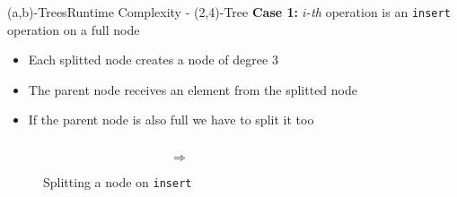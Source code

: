 \begin{frame}{(a,b)-Trees}{Runtime Complexity - (2,4)-Tree}
  \textbf{Case 1:}
  {\color{Mittel-Blau}$i$}-\textit{th} operation is an
  \texttt{\color{Mittel-Blau}insert} operation on a full node
  \begin{itemize}
    \item<2->
      Each splitted node creates a node of {\color{Mittel-Blau}degree 3}
    \item<3->
      The parent node receives an element from the splitted node
    \item<4->
      If the parent node is also full we have to split it too
  \end{itemize}
  \begin{figure}
    \begin{columns}
      \begin{column}{0.35\linewidth}
        \begin{adjustbox}{width=\linewidth}
          
        \end{adjustbox}
      \end{column}
      \begin{column}{0.1\linewidth}
        \begin{center}
          $\Rightarrow$
        \end{center}
      \end{column}
      \begin{column}{0.35\linewidth}
        \begin{adjustbox}{width=\linewidth}
          
        \end{adjustbox}
      \end{column}
    \end{columns}
    \caption{Splitting a node on \texttt{\color{Mittel-Blau}insert}}
    \label{fig:a_b_tree:node_split_potential}
  \end{figure}
\end{frame}


